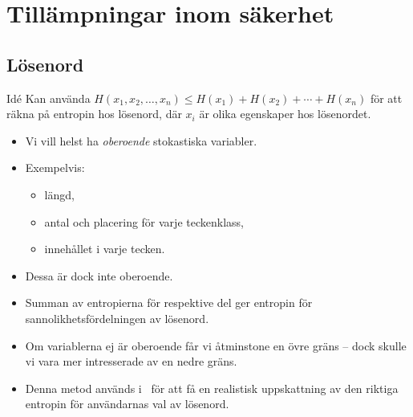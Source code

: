 \documentclass{beamer}
\begin{document}
\section[Tillämpningar]{Tillämpningar inom säkerhet}

\subsection{Lösenord}

\begin{frame}
  \begin{block}{Idé}
    Kan använda \(H(x_1, x_2, \ldots, x_n) \leq H(x_1) + H(x_2) + \cdots 
      + H(x_n)\) för att räkna på entropin hos lösenord, där \(x_i\) är olika 
    egenskaper hos lösenordet.
  \end{block}

  \begin{example}
    \begin{itemize}
      \item Vi vill helst ha \emph{oberoende} stokastiska variabler.

      \item Exempelvis:
        \begin{itemize}
          \item längd,
          \item antal och placering för varje teckenklass,
          \item innehållet i varje tecken.
        \end{itemize}

      \item Dessa är dock inte oberoende.

      \item Summan av entropierna för respektive del ger entropin för 
        sannolikhetsfördelningen av lösenord.

    \end{itemize}
  \end{example}

\end{frame}

\begin{frame}
  \begin{remark}
    \begin{itemize}
      \item Om variablerna ej är oberoende får vi åtminstone en övre gräns -- 
        dock skulle vi vara mer intresserade av en nedre gräns.

      \item Denna metod används i~\cite{Komanduri2011opa} för att få en 
        realistisk uppskattning av den riktiga entropin för användarnas val av 
        lösenord.

    \end{itemize}
  \end{remark}
\end{frame}
\end{document}
